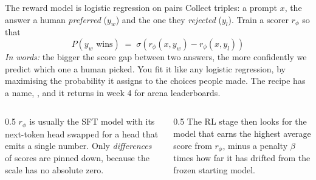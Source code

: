 \documentclass[aspectratio=169,10pt]{beamer}
\begin{document}
\begin{frame}{The reward model is logistic regression on pairs}
  Collect triples: a prompt $x$, the answer a human \emph{preferred} ($y_w$)
  and the one they \emph{rejected} ($y_l$). Train a scorer $r_\phi$ so that
  \[
    P(y_w \text{ wins}) \;=\;
    \sigma\!\left(r_\phi(x,y_w) - r_\phi(x,y_l)\right)
  \]
  \emph{In words:} the bigger the score gap between two answers, the more
  confidently we predict which one a human picked. You fit it like any logistic
  regression, by maximising the probability it assigns to the choices people
  made. The recipe has a name, , and it returns in week 4
  for arena leaderboards.
  \vspace{0.4em}

  \begin{columns}[T]
    \begin{column}{0.5\textwidth}
      \small
      $r_\phi$ is usually the SFT model with its next-token head swapped for a
      head that emits a single number. Only \emph{differences} of scores are
      pinned down, because the scale has no absolute zero.
    \end{column}
    \begin{column}{0.5\textwidth}
      \small
      The RL stage then looks for the model that earns the highest average
      score from $r_\phi$, minus a penalty $\beta$ times how far it has drifted
      from the frozen starting model.
    \end{column}
  \end{columns}
\end{frame}
\end{document}
